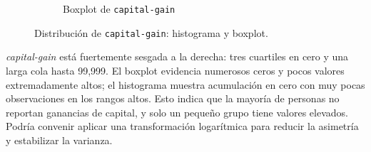 \documentclass[12pt,a4paper]{article}
\begin{document}
\begin{enumerate}
\begin{figure}[H]
\begin{subfigure}[b]{0.45\textwidth}
        \caption{Boxplot de \texttt{capital-gain}}
        \label{fig:capital_gain_boxplot}
      \end{subfigure}
      \caption{Distribución de \texttt{capital-gain}: histograma y boxplot.}
      \label{fig:capital_gain_visual}
    \end{figure}

    \emph{capital-gain} está fuertemente sesgada a la derecha: tres cuartiles en cero y una larga cola hasta 
    99,999. El boxplot evidencia numerosos ceros y pocos valores extremadamente altos; el histograma muestra 
    acumulación en cero con muy pocas observaciones en los rangos altos. Esto indica que la mayoría de personas 
    no reportan ganancias de capital, y solo un pequeño grupo tiene valores elevados. Podría convenir aplicar una 
    transformación logarítmica para reducir la asimetría y estabilizar la varianza.


\end{enumerate}
\end{document}
